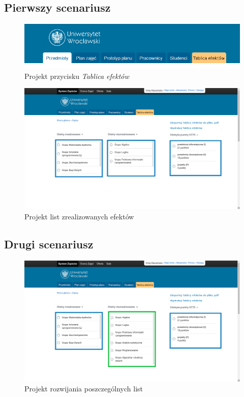 \documentclass{article}
\begin{document}
\subsection{Pierwszy scenariusz}
\begin{figure}[H]
	\begin{center}
		\caption{Projekt przycisku \textit{Tablica efektów}}
		\includegraphics[scale=0.5]{te.png}
	\end{center}
\end{figure}

\begin{figure}[H]
	\begin{center}
		\caption{Projekt list zrealizowanych efektów}
		\includegraphics[scale=0.23]{tabl.png}
	\end{center}
\end{figure}

\subsection{Drugi scenariusz}
\begin{figure}[H]
	\begin{center}
		\caption{Projekt rozwijania poszczególnych list}
		\includegraphics[scale=0.23]{rozwin.png}
	\end{center}
\end{figure}
\end{document}
